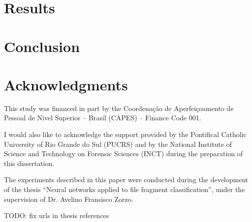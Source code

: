 \documentclass[review]{elsarticle}
\begin{document}
\section{Results}


\section{Conclusion}


\section{Acknowledgments}
This study was financed in part by the Coordenação de Aperfeiçoamento de Pessoal de Nivel Superior – Brasil (CAPES) – Finance Code 001.

I would also like to acknowledge the support provided by the Pontifical Catholic University of Rio Grande do Sul (PUCRS) and by the National Institute of Science and Technology on Forensic Sciences (INCT) during the preparation of this dissertation.

The experiments described in this paper were conducted during the development of the thesis ``Neural networks applied to file fragment classification''\cite{romero_atila_leites_neural_2020}, under the supervision of Dr. Avelino Fransisco Zorzo.

TODO: fix urls in thesis references


\end{document}
